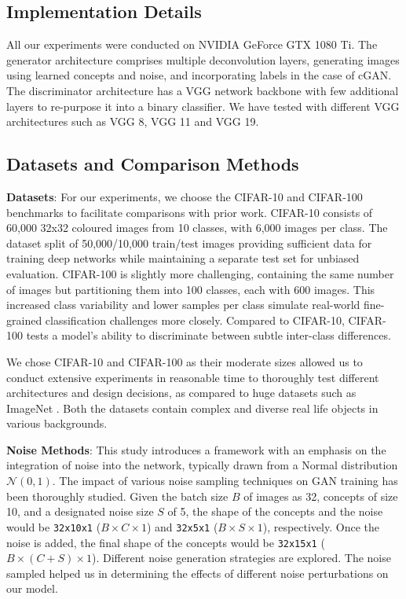 \documentclass[letterpaper]{article}
\begin{document}
\subsection{Implementation Details}
All our experiments were conducted on NVIDIA GeForce GTX 1080 Ti. The generator architecture comprises multiple deconvolution layers, generating images using learned concepts and noise, and incorporating labels in the case of cGAN. The discriminator architecture has a VGG network backbone with few additional layers to re-purpose it into a binary classifier. We have tested with different VGG \cite{VGG} architectures such as VGG 8, VGG 11 and VGG 19.


\subsection{Datasets and Comparison Methods}\label{sec:data_noise}

\textbf{Datasets}: For our experiments, we choose the CIFAR-10 and CIFAR-100 \cite{CIFAR10} benchmarks to facilitate comparisons with prior work. CIFAR-10 consists of 60,000 32x32 coloured images from 10 classes, with 6,000 images per class. The dataset split of 50,000/10,000 train/test images providing sufficient data for training deep networks while maintaining a separate test set for unbiased evaluation. CIFAR-100 is slightly more challenging, containing the same number of images but partitioning them into 100 classes, each with 600 images. This increased class variability and lower samples per class simulate real-world fine-grained classification challenges more closely. Compared to CIFAR-10, CIFAR-100 tests a model's ability to discriminate between subtle inter-class differences.


We chose CIFAR-10 and CIFAR-100 as their moderate sizes allowed us to conduct extensive experiments in reasonable time to thoroughly test different architectures and design decisions, as compared to huge datasets such as ImageNet \cite{IMAGENET}. Both the datasets contain complex and diverse real life objects in various backgrounds.

\textbf{Noise Methods}: This study introduces a framework with an emphasis on the integration of noise into the network, typically drawn from a Normal distribution $\mathcal{N}(0,1)$. The impact of various noise sampling techniques on GAN training has been thoroughly studied. Given the batch size $B$ of images as 32, concepts of size 10, and a designated noise size $S$ of 5, the shape of the concepts and the noise would be \texttt{32x10x1} (\(B \times C \times 1\)) and \texttt{32x5x1} (\(B \times S \times 1\)), respectively. Once the noise is added, the final shape of the concepts would be \texttt{32x15x1} (\(B \times (C+S) \times 1\)). Different noise generation strategies are explored. The noise sampled helped us in determining the effects of different noise perturbations on our model.
\end{document}
